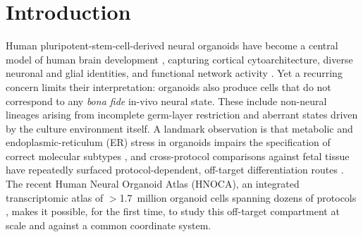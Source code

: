 \documentclass[11pt]{article}
\begin{document}
\begin{abstract}
here) and read the specifically in-vitro biology from the stress diagnostics rather than from the
adversary. Finally, on the \emph{non-neural} contaminant populations, where, unlike the
reference-limited neural compartment, we are statistically powered, we show the geometry method works as
an instrument: pairwise distances clear a matched-$N$ noise floor ($14$--$105\times$) and their
\emph{rank order} recovers the primary lineage geometry (distance-matrix $r=0.90$). A direct test,
however, finds the per-lineage source offsets are not constant (mutual cosine $0.15$), so the individual
distances are confounded rather than clean lineage metrics, a validated ordering, not yet a clean
geometry. NullState thus provides a reference-anchored, \emph{comparative} off-target measurement, to be
read against the reference's own domain, not as an absolute fidelity score, and an identifiability
boundary for when latent calibration without anchoring is attainable at all.
\end{abstract}

\vspace{0.5em}

\section{Introduction}
Human pluripotent-stem-cell-derived neural organoids have become a central model of human brain
development \citep{lancaster2013organoids,pasca2015cortical}, capturing cortical cytoarchitecture,
diverse neuronal and glial identities, and functional network activity
\citep{quadrato2017organoids,velasco2019organoids,trujillo2019oscillatory}. Yet a recurring concern
limits their interpretation: organoids also produce cells that do not correspond to any \emph{bona
fide} in-vivo neural state. These include non-neural lineages arising from incomplete germ-layer
restriction and aberrant states driven by the culture environment itself. A landmark observation is
that metabolic and endoplasmic-reticulum (ER) stress in organoids impairs the specification of correct
molecular subtypes \citep{bhaduri2020stress}, and cross-protocol comparisons against fetal tissue have
repeatedly surfaced protocol-dependent, off-target differentiation routes
\citep{tanaka2020synthetic,kanton2019atlas}. The recent Human Neural Organoid Atlas
(HNOCA), an integrated transcriptomic atlas of $>$1.7~million organoid cells spanning dozens of
protocols \citep{he2024hnoca}, makes it possible, for the first time, to study this off-target
compartment at scale and against a common coordinate system.
\end{document}
